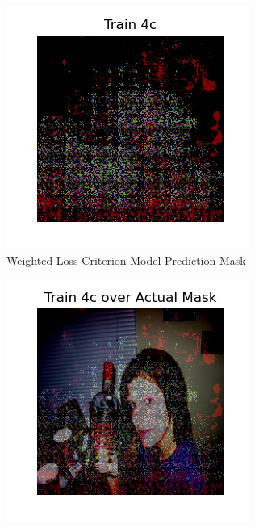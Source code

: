 \documentclass{article}
\begin{document}
\begin{figure}[h!]
  \centering
  \begin{subfigure}[b]{0.45\textwidth}
      \centering
      \includegraphics[width=\textwidth]{include/plots/train_4_c_pred.png}
      \caption{Weighted Loss Criterion Model Prediction Mask}
      \label{fig:weight_imbalanced_msk}
  \end{subfigure}
  \hfill %
  \begin{subfigure}[b]{0.45\textwidth}
      \centering
      \includegraphics[width=\textwidth]{include/plots/train_4_c_over_actual.png} %

\end{subfigure}
\end{figure}
\end{document}
